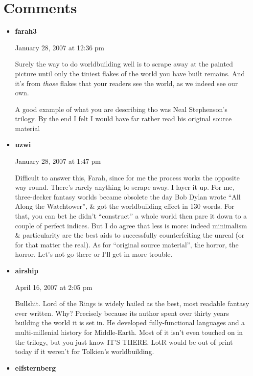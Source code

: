 \documentclass[14pt]{extarticle}
\begin{document}
\section*{Comments}

\begin{itemize}[leftmargin=*]

\item \textbf{farah3}

January 28, 2007 at 12:36 pm

Surely the way to do worldbuilding well is to scrape away at the painted picture until only the tiniest flakes of the world you have built remains. And it’s from \emph{those} flakes that your readers see the world, as we indeed see our own.

A good example of what you are describing tho was Neal Stephenson’s trilogy. By the end I felt I would have far rather read his original source material

\item \textbf{uzwi}

January 28, 2007 at 1:47 pm

Difficult to answer this, Farah, since for me the process works the opposite way round. There’s rarely anything to scrape away. I layer it up. For me, three-decker fantasy worlds became obsolete the day Bob Dylan wrote “All Along the Watchtower”, \& got the worldbuilding effect in 130 words. For that, you can bet he didn’t “construct” a whole world then pare it down to a couple of perfect indices. But I do agree that less is more: indeed minimalism \& particularity are the best aids to successfully counterfeiting the unreal (or for that matter the real). As for “original source material”, the horror, the horror. Let’s not go there or I’ll get in more trouble.

\item \textbf{airship}

April 16, 2007 at 2:05 pm

Bullshit. Lord of the Rings is widely hailed as the best, most readable fantasy ever written. Why? Precisely because its author spent over thirty years building the world it is set in. He developed fully-functional languages and a multi-millenial history for Middle-Earth. Most of it isn’t even touched on in the trilogy, but you just know IT’S THERE. LotR would be out of print today if it weren’t for Tolkien’s worldbuilding.

\item \textbf{elfsternberg}


\end{itemize}
\end{document}
